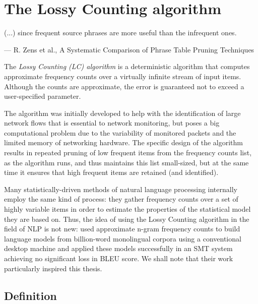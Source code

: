 \chapter{The Lossy Counting algorithm}
\label{chap:lossy-counting}

\setlength{\epigraphwidth}{1.0\textwidth}
\epigraph{(...) since frequent source phrases are more useful than the infrequent ones.}{--- R. Zens et al., A Systematic Comparison of Phrase Table Pruning Techniques}

The \emph{Lossy Counting (LC) algorithm} \citep{manku:lossycounting} is
a deterministic algorithm that computes approximate frequency counts
over a virtually infinite stream of input items.
Although the counts are approximate, the error is guaranteed not to exceed
a user-specified parameter.

The algorithm was initially developed to help with the identification of
large network flows that is essential to network monitoring, but poses a big
computational problem due to the variability of monitored packets and the limited
memory of networking hardware.
The specific design of the algorithm results in repeated pruning of low frequent
items from the frequency counts list, as the algorithm runs, and thus maintains
this list small-sized, but at the same time it ensures that high frequent items are
retained (and identified).

Many statistically-driven methods of natural language processing internally
employ the same kind of process: they gather frequency counts over a set of highly
variable items in order to estimate the properties of the statistical model they are
based on.
Thus, the idea of using the Lossy Counting algorithm in the field of NLP is not new:
\citet{goyal:streaminglm} used approximate n-gram frequency counts to build language
models from billion-word monolingual corpora using a conventional desktop machine and
applied these models successfully in an SMT system achieving no significant loss in BLEU
score. We shall note that their work particularly inspired this thesis.

\section{Definition}
\label{sec:lossy-counting-definition}

